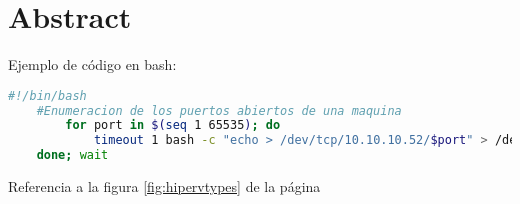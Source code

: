 \newpage
\thispagestyle{empty}
\section*{Abstract}
Ejemplo de código en bash:

\begin{lstlisting}[language=Bash, caption=Bash example]
	#!/bin/bash
	#Enumeracion de los puertos abiertos de una maquina
		for port in $(seq 1 65535); do 
			timeout 1 bash -c "echo > /dev/tcp/10.10.10.52/$port" > /dev/null 2>&1 && echo "$port/tcp" &
	done; wait
\end{lstlisting}

Referencia a la figura \ref{fig:hipervtypes} de la página \pageref{fig:hipervtypes} 

\afterpage{\blankpage}

